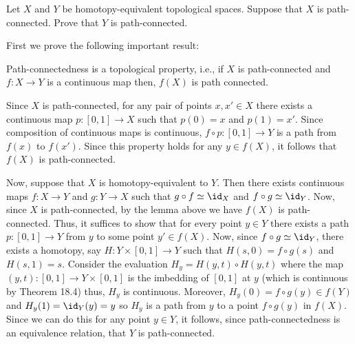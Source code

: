 \begin{problem}
  Let \(X\) and \(Y\) be homotopy-equivalent topological spaces. Suppose
  that \(X\) is path-connected. Prove that \(Y\) is path-connected.
\end{problem}
\begin{solution}
  First we prove the following important result:
  \begin{lemma*}
    Path-connectedness is a topological property, i.e., if \(X\) is
    path-connected and \(f\colon X\to Y\) is a continuous map then,
    \(f(X)\) is path connected.
  \end{lemma*}
  \begin{subproof}
    Since \(X\) is path-connected, for any pair of points \(x,x'\in X\)
    there exists a continuous map \(p\colon [0,1]\to X\) such that
    \(p(0)=x\) and \(p(1)=x'\). Since composition of continuous maps is
    continuous, \(f\circ p\colon[0,1]\to Y\) is a path from \(f(x)\) to
    \(f(x')\). Since this property holds for any \(y\in f(X)\), it follows
    that \(f(X)\) is path-connected.
  \end{subproof}
  Now, suppose that \(X\) is homotopy-equivalent to \(Y\). Then there
  exists continuous maps \(f\colon X\to Y\) and \(g\colon Y\to X\) such
  that \(g\circ f\simeq\id_X\) and \(f\circ g\simeq\id_Y\). Now, since
  \(X\) is path-connected, by the lemma above we have \(f(X)\) is
  path-connected. Thus, it suffices to show that for every point \(y\in Y\)
  there exists a path \(p\colon [0,1]\to Y\) from \(y\) to some point
  \(y'\in f(X)\). Now, since \(f\circ g\simeq\id_Y\), there exists a
  homotopy, say \(H\colon Y\times[0,1]\to Y\) such that
  \(H(s,0)=f\circ g(s)\) and \(H(s,1)=s\). Consider the evaluation
  \(H_y= H(y,t)\circ H(y,t)\) where the map
  \((y,t)\colon [0,1]\to Y\times[0,1]\) is the imbedding of \([0,1]\) at
  \(y\) (which is continuous by Theorem 18.4) thus, \(H_y\) is
  continuous. Moreover, \(H_y(0)=f\circ g(y)\in f(Y)\) and
  \(H_y(1)=\id_Y(y)=y\) so \(H_y\) is a path from \(y\) to a point
  \(f\circ g(y)\) in \(f(X)\). Since we can do this for any point
  \(y\in Y\), it follows, since path-connectedness is an equivalence
  relation, that \(Y\) is path-connected.
\end{solution}
